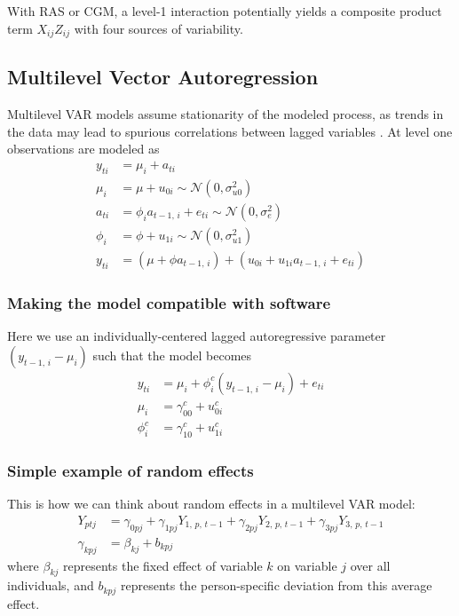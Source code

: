 With RAS or CGM, a level-1 interaction potentially yields a composite product term $X_{ij} Z_{ij}$ with four sources of variability. 

\subsection{Multilevel Vector Autoregression}
Multilevel VAR models assume stationarity of the modeled process, as trends in the data may lead to spurious correlations between lagged variables \cite{rovine2006multilevel}. At level one observations are modeled as
\begin{equation}
    \begin{split}
        y_{ti} &= \mu_i + a_{ti} \\
        \mu_i &= \mu + u_{0i} \sim \mathcal{N}(0, \sigma_{u0}^2) \\
        a_{ti} &= \phi_i a_{t-1,\,i} + e_{ti} \sim \mathcal{N}(0, \sigma_{e}^2) \\
        \phi_{i} &= \phi + u_{1i} \sim \mathcal{N}(0, \sigma_{u1}^2) \\
        y_{ti} &= (\mu + \phi a_{t-1,\,i}) + (u_{0i} + u_{1i} a_{t-1,\,i} + e_{ti})
    \end{split}
\end{equation}

\subsubsection{Making the model compatible with software}
Here we use an individually-centered lagged autoregressive parameter $(y_{t-1,\,i} - \mu_i)$ such that the model becomes
\begin{equation}
    \begin{split}
        y_{ti} &= \mu_i + \phi_i^c (y_{t-1,\,i} - \mu_i) + e_{ti} \\
        \mu_i &= \gamma_{00}^c + u_{0i}^c \\
        \phi_i^c &= \gamma_{10}^c + u_{1i}^c
    \end{split}
\end{equation}

\subsubsection{Simple example of random effects}
This is how we can think about random effects in a multilevel VAR model:
\begin{equation}
    \begin{split}
        Y_{ptj} &= \gamma_{0pj} + \gamma_{1pj} Y_{1,\,p,\,t-1} + \gamma_{2pj} Y_{2,\,p,\,t-1} + \gamma_{3pj} Y_{3,\,p,\,t-1} \\
        \gamma_{kpj} &= \beta_{kj} + b_{kpj}
    \end{split}
\end{equation}
where $\beta_{kj}$ represents the fixed effect of variable $k$ on variable $j$ over all individuals, and $b_{kpj}$ represents the person-specific deviation from this average effect.

